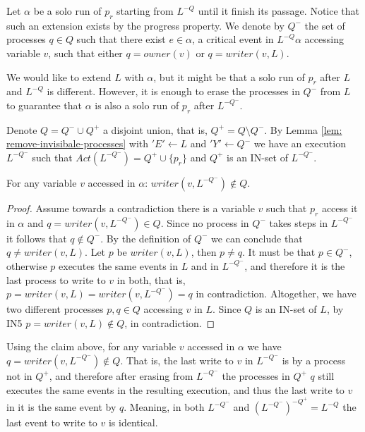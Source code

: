 Let $\alpha$ be a solo run of $p_r$ starting from $L^{-Q}$ until it finish its passage. Notice that such an extension exists by the progress property. We denote by $Q^-$ the set of processes $q \in Q$ such that there exist $e \in \alpha$, a critical event in $L^{-Q} \alpha$ accessing variable $v$, such that either $q = owner(v)$ or $q = writer(v,L)$.

We would like to extend $L$ with $\alpha$, but it might be that a solo run of $p_r$ after $L$ and $L^{-Q}$ is different. However, it is enough to erase the processes in $Q^-$ from $L$ to guarantee that $\alpha$ is also a solo run of $p_r$ after $L^{-Q^-}$.

Denote $Q = Q^- \cup Q^+$ a disjoint union, that is, $Q^+ = Q \setminus Q^-$. By Lemma \ref{lem: remove-invisibale-processes} with $'E' \leftarrow L$ and $'Y' \leftarrow Q^-$ we have an execution $L^{-Q^-}$ such that $Act(L^{-Q^-}) = Q^+ \cup \{p_r\}$ and $Q^+$ is an IN-set of $L^{-Q^-}$.

\begin{claim-subsection} \label{claim:v-access-in-alpha}
	For any variable $v$ accessed in $\alpha$: $writer(v,L^{-Q^-}) \notin Q$.
\end{claim-subsection}

\begin{proof}
	Assume towards a contradiction there is a variable $v$ such that $p_r$ access it in $\alpha$ and $q = writer(v,L^{-Q^-}) \in Q$. Since no process in $Q^-$ takes steps in $L^{-Q^-}$ it follows that $q \notin Q^-$. By the definition of $Q^-$ we can conclude that $q \neq writer(v,L)$. Let $p$ be $writer(v,L)$, then $p \neq q$. It must be that $p \in Q^-$, otherwise $p$ executes the same events in $L$ and in $L^{-Q^-}$, and therefore it is the last process to write to $v$ in both, that is, $p = writer(v,L) = writer(v,L^{-Q^-}) = q$ in contradiction.
	Altogether, we have two different processes $p,q \in Q$ accessing $v$ in $L$. Since $Q$ is an IN-set of $L$, by IN5 $p = writer(v,L) \notin Q$, in contradiction.
\end{proof}

Using the claim above, for any variable $v$ accessed in $\alpha$ we have $q = writer(v,L^{-Q^-}) \notin Q$. That is, the last write to $v$ in $L^{-Q^-}$ is by a process not in $Q^+$, and therefore after erasing from $L^{-Q^-}$ the processes in $Q^+$ $q$ still executes the same events in the resulting execution, and thus the last write to $v$ in it is the same event by $q$. Meaning, in both $L^{-Q^-}$ and $(L^{-Q^-})^{-Q^+} = L^{-Q}$ the last event to write to $v$ is identical.


